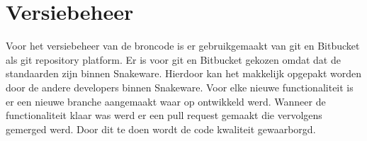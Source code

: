 \section{Versiebeheer}
Voor het versiebeheer van de broncode is er gebruikgemaakt van git en Bitbucket als git repository platform. 
Er is voor git en Bitbucket gekozen omdat dat de standaarden zijn binnen Snakeware.
Hierdoor kan het makkelijk opgepakt worden door de andere developers binnen Snakeware.
Voor elke nieuwe functionaliteit is er een nieuwe branche aangemaakt waar op ontwikkeld werd.
Wanneer de functionaliteit klaar was werd er een pull request gemaakt die vervolgens gemerged werd.
Door dit te doen wordt de code kwaliteit gewaarborgd.
